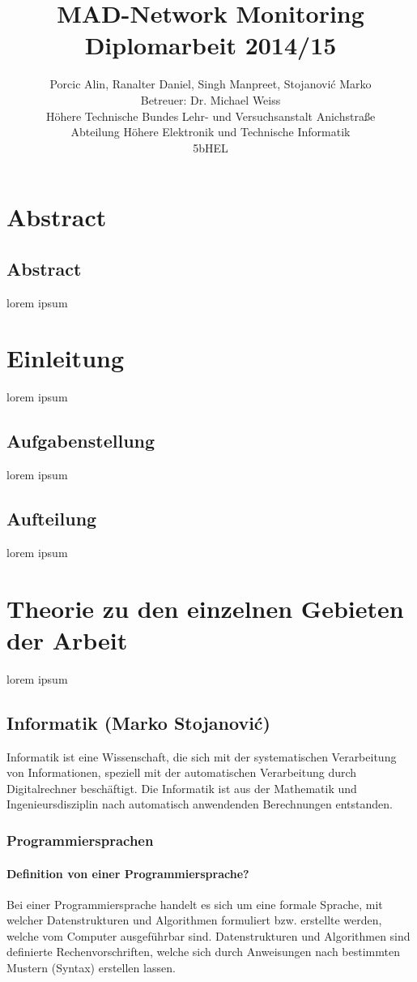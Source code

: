 \documentclass[12pt,a4paper]{report}
\title{MAD-Network Monitoring\\
Diplomarbeit 2014/15}
\author{Porcic Alin, Ranalter Daniel, Singh Manpreet, Stojanovi\'{c} Marko\\
Betreuer: Dr. Michael Weiss\\
Höhere Technische Bundes Lehr- und Versuchsanstalt Anichstraße\\
Abteilung Höhere Elektronik und Technische Informatik\\
5bHEL}
\begin{document}
\maketitle
\newpage

\tableofcontents
\newpage

\pagestyle{fancy}
\part{Abstract}
\chapter{Abstract}
\thispagestyle{fancy}

lorem ipsum

\part{Einleitung}
\thispagestyle{fancy}

lorem ipsum

\chapter{Aufgabenstellung}
lorem ipsum

\chapter{Aufteilung}
lorem ipsum 

\part{Theorie zu den einzelnen Gebieten der Arbeit}
lorem ipsum
\chapter{Informatik (Marko Stojanovi\'{c})}
Informatik ist eine Wissenschaft, die sich mit der systematischen Verarbeitung von Informationen, speziell mit der automatischen Verarbeitung durch Digitalrechner beschäftigt. Die Informatik ist aus der Mathematik und Ingenieursdisziplin nach automatisch anwendenden Berechnungen entstanden.

\section{Programmiersprachen}

\subsection{Definition von einer Programmiersprache?}
Bei einer Programmiersprache handelt es sich um eine formale Sprache, mit welcher Datenstrukturen und Algorithmen formuliert bzw. erstellte werden, welche vom Computer ausgeführbar sind. Datenstrukturen und Algorithmen sind definierte Rechenvorschriften, welche sich durch Anweisungen nach bestimmten Mustern (Syntax) erstellen lassen.\\
\end{document}
